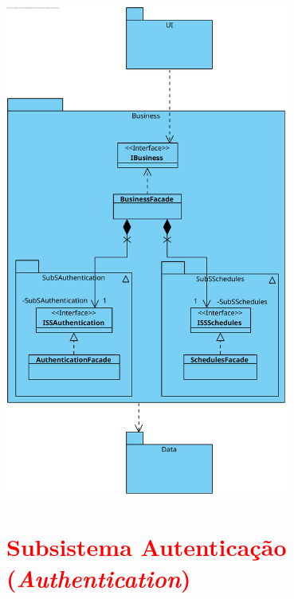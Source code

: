 \documentclass[a4paper,12pt]{scrreprt}
\begin{document}
\begin{minipage}{\textwidth}
    \centering
    \includegraphics[width=0.7\textwidth]{images/class-diagrams/1-arquitetura-geral.png}
    \label{fig:5-1-arquitetura_geral}
\end{minipage}

\section{\textcolor{red}{Subsistema Autenticação (\textit{Authentication})}}
\end{document}
